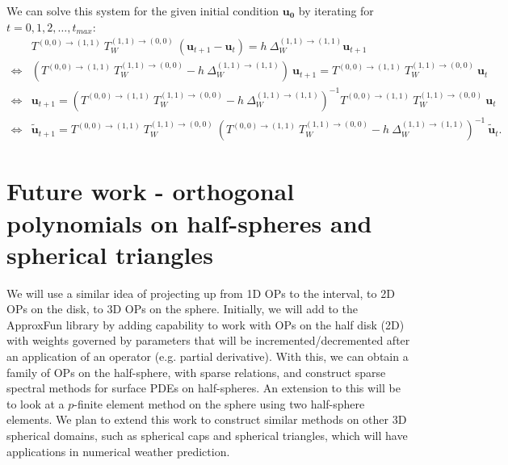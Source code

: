\documentclass[11pt, oneside]{article}   	%
\newcommand{\Wii}{W^{(1,1)}}
\newcommand{\laplacewii}{\Delta_W^{(1,1)\to(1,1)}}
\begin{document}
We can solve this system for the given initial condition $\mathbf{u_0}$ by iterating for $t = 0,1,2,\dots,t_{max}$:
\begin{align}
	&T^{(0,0)\to(1,1)} \: T_W^{(1,1)\to(0,0)} \: (\mathbf{u}_{t+1} - \mathbf{u}_t) = h \: \laplacewii \mathbf{u}_{t+1} \nonumber \\
	\iff& (T^{(0,0)\to(1,1)} \:T_W^{(1,1)\to(0,0)} - h \: \laplacewii) \: \mathbf{u}_{t+1} = T^{(0,0)\to(1,1)} \: T_W^{(1,1)\to(0,0)} \: \mathbf{u}_t \nonumber \\
	\iff& \mathbf{u}_{t+1} = (T^{(0,0)\to(1,1)} \: T_W^{(1,1)\to(0,0)} - h \: \laplacewii)^{-1} T^{(0,0)\to(1,1)} \: T_W^{(1,1)\to(0,0)} \: \mathbf{u}_t \nonumber \\
	\iff& \mathbf{\tilde{u}}_{t+1} = T^{(0,0)\to(1,1)} \: T_W^{(1,1)\to(0,0)} \: (T^{(0,0)\to(1,1)} \: T_W^{(1,1)\to(0,0)} - h \: \laplacewii)^{-1} \: \mathbf{\tilde{u}}_t.
\end{align}




%
\section{Future work - orthogonal polynomials on half-spheres and spherical triangles}

We will use a similar idea of projecting up from 1D OPs to the interval, to 2D OPs on the disk, to 3D OPs on the sphere. Initially, we will add to the ApproxFun library by adding capability to work with OPs on the half disk (2D) with weights governed by parameters that will be incremented/decremented after an application of an operator (e.g. partial derivative). With this, we can obtain a family of OPs on the half-sphere, with sparse relations, and construct sparse spectral methods for surface PDEs on half-spheres. An extension to this will be to look at a $p$-finite element method on the sphere using two half-sphere elements. We plan to extend this work to construct similar methods on other 3D spherical domains, such as spherical caps and spherical triangles, which will have applications in numerical weather prediction. 
\end{document}
